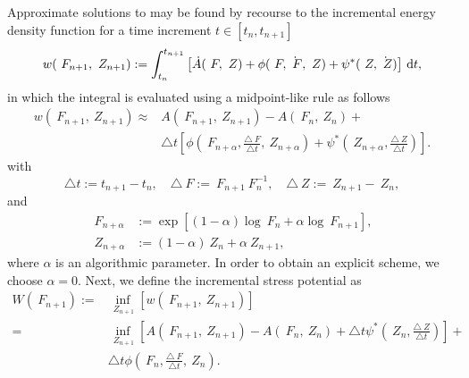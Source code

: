 \documentclass[12pt]{article}
\numberwithin{equation}{section}
\begin{document}
Approximate solutions to  may be found by
recourse to the incremental energy density function for a time
increment $t \in [t_n, t_{n+1}]$
\begin{equation} \label{incremental-energy-density}
  w(~F_{n+1}, ~Z_{n+1}) :=
  \int_{t_n}^{t_{n+1}}
  \left[
    \dot{A}(~F, ~Z)
    +
    \phi(~F, \dot{~F}, ~Z)
    +
    \psi^*(~Z, \dot{~Z})
  \right]
  \, \mathop{}\!\mathrm{d} t,
\end{equation}
in which the integral is evaluated using a midpoint-like rule
as follows
\begin{equation} \label{incremental-energy-density-mid-point}
  \begin{split}
    w(~F_{n+1}, ~Z_{n+1}) \approx
    &
    A(~F_{n+1}, ~Z_{n+1}) - A(~F_n, ~Z_n) +
    \\
    &
    \triangle t
    \left[
      \phi
      \left(
        ~F_{n+\alpha}, \frac{\triangle ~F}{\triangle t}, ~Z_{n+\alpha}
      \right)
      +
      \psi^*
      \left(
        ~Z_{n+\alpha}, \frac{\triangle ~Z}{\triangle t}
      \right)
    \right].
  \end{split}
\end{equation}
with
\begin{equation} \label{eq:increments}
  \triangle t := t_{n+1} - t_n,
  \quad
  \triangle ~F := ~F_{n+1} ~F_n^{-1},
  \quad
  \triangle ~Z := ~Z_{n+1} - ~Z_n,
\end{equation}
and
\begin{equation} \label{eq:mid-values}
  \begin{split}
    ~F_{n+\alpha} & := \exp[(1 - \alpha) \log ~F_n + \alpha \log ~F_{n+1}],
    \\
    ~Z_{n+\alpha} & := (1 - \alpha) ~Z_n + \alpha ~Z_{n+1},
  \end{split}
\end{equation}
where $\alpha$ is an algorithmic parameter. In order to obtain an
explicit scheme, we choose $\alpha = 0$. Next, we define the
incremental stress potential as
\begin{equation} \label{eq:incremental-stress-potential}
  \begin{split}
    W(~F_{n+1})
    :=
    &
    \inf_{~Z_{n+1}}[w(~F_{n+1}, ~Z_{n+1})]
    \\
    =
    &
    \inf_{~Z_{n+1}}
    \left[
      A(~F_{n+1}, ~Z_{n+1}) - A(~F_n, ~Z_n)
      +
      \triangle t
      \psi^*\left(~Z_n, \frac{\triangle ~Z}{\triangle t}\right)
    \right]
    +
    \\
    &
    \triangle t
    \phi\left(~F_n, \frac{\triangle ~F}{\triangle t}, ~Z_n\right).
  \end{split}
\end{equation}
\end{document}
